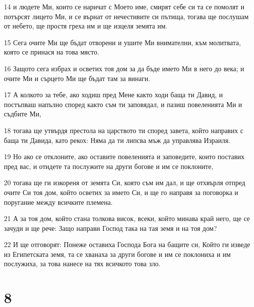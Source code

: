 \par 14 и людете Ми, които се наричат с Моето име, смирят себе си та се помолят и потърсят лицето Ми, и се върнат от нечестивите си пътища, тогава ще послушам от небето, ще простя греха им и ще изцеля земята им.
\par 15 Сега очите Ми ще бъдат отворени и ушите Ми внимателни, към молитвата, която се принася на това място.
\par 16 Защото сега избрах и осветих тоя дом за да бъде името Ми в него до века; и очите Ми и сърцето Ми ще бъдат там за винаги.
\par 17 А колкото за тебе, ако ходиш пред Мене както ходи баща ти Давид, и постъпваш напълно според както съм ти заповядал, и пазиш повеленията Ми и съдбите Ми,
\par 18 тогава ще утвърдя престола на царството ти според завета, който направих с баща ти Давида, като рекох: Няма да ти липсва мъж да управлява Израиля.
\par 19 Но ако се отклоните, ако оставите повеленията и заповедите, които поставих пред вас, и отидете та послужите на други богове и им се поклоните,
\par 20 тогава ще ги изкореня от земята Си, която съм им дал, и ще отхвърля отпред очите Си тоя дом, който осветих за името Си, и ще го направя за поговорка и поругание между всичките племена.
\par 21 А за тоя дом, който стана толкова висок, всеки, който минава край него, ще се зачуди и ще рече: Защо направи Господ така на тая земя и на тоя дом?
\par 22 И ще отговорят: Понеже оставиха Господа Бога на бащите си, Който ги изведе из Египетската земя, та се хванаха за други богове и им се поклониха и им послужиха, за това нанесе на тях всичкото това зло.

\chapter{8}

